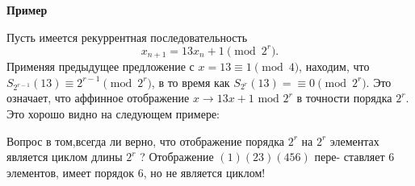 \newpage
\noindent\textbf{Пример}

Пусть имеется рекуррентная последовательность
$$x_{n+1} = 13x_n + 1 \pmod{2^r}.$$
Применяя предыдущее предложение с $x = 13 \equiv 1 \pmod{4}$, находим, что\linebreak
$S_{2^{r-1}}(13) \equiv 2^{r - 1} \pmod{2^r}$, в то время как $S_{2^r}(13) =\equiv 0 \pmod{2^r}$. Это\linebreak
означает, что аффинное отображение $x \rightarrow 13x+1 \text{ mod } 2^r$ в точности\linebreak
порядка $2^r$. Это хорошо видно на следующем примере:
\begin{figure}[h]
\end{figure}

Вопрос в том,всегда ли верно, что отображение порядка $2^r$ на $2^r$\linebreak
элементах является циклом длины $2^r$ ? Отображение $(1) (23) (456)$ пере­-\linebreak
ставляет $6$ элементов, имеет порядок $6$, но не является циклом!
